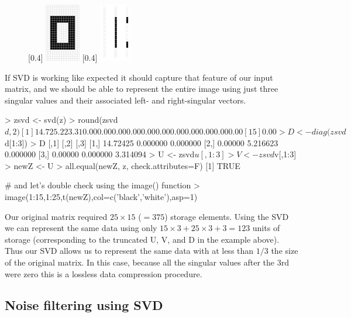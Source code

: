 \begin{figure}[ht!]
\begin{center}
[0.4\linewidth]{%
\includegraphics[height=1in]{./figures/hands-on6/zero.jpg}%
}
[0.4\linewidth]{%
\includegraphics[height=1in]{./figures/hands-on6/zero-vecs.jpg}%
}
\end{center}
\end{figure}

If SVD is working like expected it should capture that feature of our input matrix, and we should be able to represent the entire image using just three singular values and their associated left- and right-singular vectors.

\begin{R}
> zsvd <- svd(z)
> round(zsvd$d,2)
 [1] 14.72  5.22  3.31  0.00  0.00  0.00  0.00  0.00  0.00  0.00  0.00  0.00  0.00  0.00
[15]  0.00
> D <- diag(zsvd$d[1:3])
> D
         [,1]     [,2]     [,3]
[1,] 14.72425 0.000000 0.000000
[2,]  0.00000 5.216623 0.000000
[3,]  0.00000 0.000000 3.314094
> U <- zsvd$u[,1:3]
> V <- zsvd$v[,1:3]
> newZ <- U %
> all.equal(newZ, z, check.attributes=F)
[1] TRUE

# and let's double check using the image() function
> image(1:15,1:25,t(newZ),col=c('black','white'),asp=1)
\end{R}

Our original matrix required $25 \times 15$ ($= 375$) storage elements. Using the SVD we can represent the same data using only $15 \times 3 + 25 \times 3 + 3 = 123$ units of storage (corresponding to the truncated U, V, and D in the example above). Thus our SVD allows us to represent the same data with at less than $1/3$ the size of the original matrix. In this case, because all the singular values after the 3rd were zero this is a lossless data compression procedure.


\subsection{Noise filtering using SVD}


